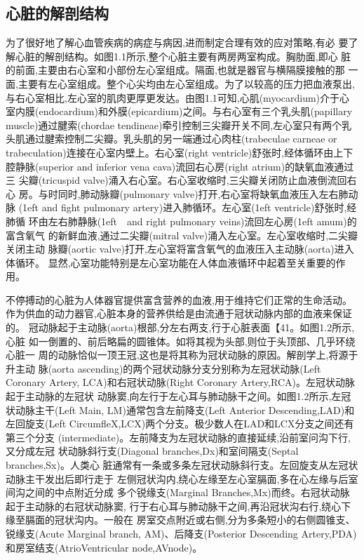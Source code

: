 \subsection{心脏的解剖结构}
为了很好地了解心血管疾病的病症与病因,进而制定合理有效的应对策略,有必
要了解心脏的解剖结构。如图1.1所示,整个心脏主要有两房两室构成。胸肋面,即心
脏的前面,主要由右心室和小部份左心室组成。隔面,也就是器官与横隔膜接触的那
一面,主要有左心室组成。整个心尖均由左心室组成。为了以较高的压力把血液泵出,
与右心室相比,左心室的肌肉更厚更发达。由图1.1可知,心肌(myocardium)介于心
室内膜(endocardium)和外膜(epicardium)之间。与右心室有三个乳头肌(papillary
muscle)通过腱索(chordae tendineae)牵引控制三尖瓣开关不同,左心室只有两个乳
头肌通过腱索控制二尖瓣。乳头肌的另一端通过心肉柱(trabeculae
 carneae
  or
  trabeculation)连接在心室内壁上。右心室(right ventricle)舒张时,经体循环由上下
  腔静脉(superior
   and inferior
    vena
     cava)流回右心房(right atrium)的缺氧血液通过三
     尖瓣(tricuspid valve)涌入右心室。右心室收缩时,三尖瓣关闭防止血液倒流回右心
     房。与时同时,肺动脉瓣(pulmonary valve)打开,右心室将缺氧血液压入左右肺动脉
     (1eft and fight pulmonary
      artery)进入肺循环。左心室(1eft ventricle)舒张时,经肺循
环由左右肺静脉(1eft　and right pulmonary
veins)流回左心房(1eft amum)的富含氧气
的新鲜血液,通过二尖瓣(mitral valve)涌入左心室。左心室收缩时,二尖瓣关闭主动
脉瓣(aortic valve)打开,左心室将富含氧气的血液压入主动脉(aorta)进入体循环。
显然,心室功能特别是左心室功能在人体血液循环中起着至关重要的作用。

不停搏动的心脏为人体器官提供富含营养的血液,用于维持它们正常的生命活动。
作为供血的动力器官,心脏本身的营养供给是由流通于冠状动脉内部的血液来保证的。
冠动脉起于主动脉(aorta)根部,分左右两支,行于心脏表面【41。如图1.2所示,心脏
如一倒置的、前后略扁的圆锥体。如将其视为头部,则位于头顶部、几乎环绕心脏一
周的动脉恰似一顶王冠,这也是将其称为冠状动脉的原因。解剖学上,将源于升主动
脉(aorta ascending)的两个冠状动脉分支分别称为左冠状动脉(Left
 Coronary Artery,
 LCA)和右冠状动脉(Right Coronary Artery,RCA)。左冠状动脉起于主动脉的左冠状
 动脉窦,向左行于左心耳与肺动脉干之间。如图1.2所示,左冠状动脉主干(Left Main,
 LM)通常包含左前降支(Left
  Anterior
   Descending,LAD)和左回旋支(Left
   CircumfleX,LCX)两个分支。极少数人在LAD和LCX分支之间还有第三个分支
   (intermediate)。左前降支为左冠状动脉的直接延续,沿前室问沟下行,又分成左冠
   状动脉斜行支(Diagonal branches,Dx)和室间隔支(Septal branches,Sx)。人类心
   脏通常有一条或多条左冠状动脉斜行支。左回旋支从左冠状动脉主干发出后即行走于
   左侧冠状沟内,绕心左缘至左心室膈面,多在心左缘与后室间沟之间的中点附近分成
多个锐缘支(Marginal Branches,Mx)而终。右冠状动脉起于主动脉的右冠状动脉窦,
行于右心耳与肺动脉干之间,再沿冠状沟右行,绕心下缘至膈面的冠状沟内。一般在
房室交点附近或右侧,分为多条短小的右侧圆锥支、锐缘支(Acute Marginal
 branch,
 AM)、后降支(Posterior
  Descending
   Artery,PDA)和房室结支(AtrioVentricular
   node,AVnode)。


